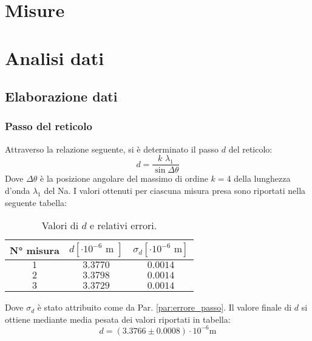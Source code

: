 \documentclass[]{article}
\let\oldsection\section%
\renewcommand{\section}{%
	\renewcommand{\theequation}{\thesection.\arabic{equation}}%
	\oldsection}%
\let\oldsubsection\subsection%
\renewcommand{\subsection}{%
	\renewcommand{\theequation}{\thesubsection.\arabic{equation}}%
	\oldsubsection}%
\begin{document}
    \section{Misure}

    \section{Analisi dati}
    \subsection{Elaborazione dati}
    \subsubsection{Passo del reticolo}
    Attraverso la relazione seguente, si è determinato il passo $d$ del reticolo: 
    \begin{equation}
        \label{passo}
        d = \frac{k \, \, \lambda_1}{\sin{\Delta\theta}}
    \end{equation}
    Dove $\Delta\theta$ è la posizione angolare del massimo di ordine $k=4$ della lunghezza d'onda $\lambda_1$ del Na.
    I valori ottenuti per ciascuna misura presa sono riportati nella seguente tabella:
    \begin{table} [H]
        \centering
        \begin{tabular}{||c|c|c||}
            \hline
            N° misura & $d [\cdot 10^{-6}\text{ m }] $ & $ \sigma_d [\cdot 10^{-6}\text{ m}] $\\
            \hline \hline
            $ 1 $ & $ 3.3770 $ & $ 0.0014 $ \\\hline
            $ 2 $ & $ 3.3798 $ & $ 0.0014 $ \\\hline
            $ 3 $ & $ 3.3729 $ & $ 0.0014 $ \\\hline
        \end{tabular}
        \caption{Valori di $d$ e relativi errori.}
        \label{d-values}
    \end{table}
    Dove $\sigma_d$ è stato attribuito come da Par. \ref{par:errore_passo}.
    Il valore finale di $d$ si ottiene mediante media pesata dei valori riportati in tabella:
    \begin{equation}
        \label{d-value}
        d = (3.3766 \pm 0.0008 ) \cdot 10^{-6} \text{m}
    \end{equation}
\end{document}
